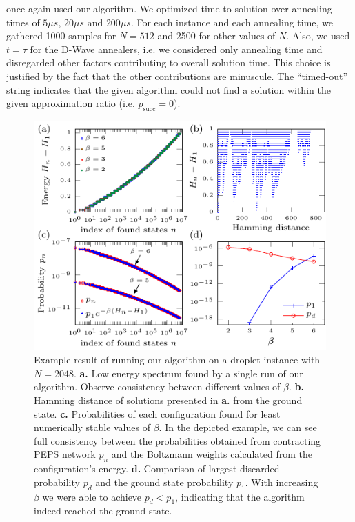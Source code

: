 \begin{table}[b]
{        once again used our algorithm. We optimized time to solution over annealing
        times of $5\mu s$, $20\mu s$ and $200\mu s$. For each instance and each
        annealing time, we gathered 1000 samples for $N=512$ and 2500 for other values
        of $N$. Also, we used $t=\tau$ for the D-Wave annealers, i.e. we considered
        only annealing time and disregarded other factors contributing to overall
        solution time. This choice is justified by the fact that the other
        contributions are minuscule. The ``timed-out'' string indicates that the given
        algorithm could not find a solution within the given approximation ratio (i.e.
      $p_{\mbox{succ}}=0$). } \label{tab:tnvspt}
\end{table}

\begin{figure}
  \includegraphics[width=\textwidth]{figures/tn-single-state.pdf}
  \caption{Example result of running our algorithm on a droplet instance with $N=2048$.
    \textbf{a.} Low energy spectrum found by a single run of our algorithm. Observe
    consistency between different values of $\beta$. \textbf{b.} Hamming distance
    of solutions presented in \textbf{a.} from the ground state. \textbf{c.}
    Probabilities of each configuration found for least numerically stable values
    of $\beta$. In the depicted example, we can see full consistency between the
    probabilities obtained from contracting PEPS network $p_{n}$ and the Boltzmann
    weights calculated from the configuration's energy. \textbf{d.} Comparison of
    largest discarded probability $p_{d}$ and the ground state probability $p_{1}$.
        With increasing $\beta$ we were able to achieve $p_{d} < p_{1}$, indicating
    that the algorithm indeed reached the ground state. }
  \label{fig:tn-single-state}
\end{figure}


